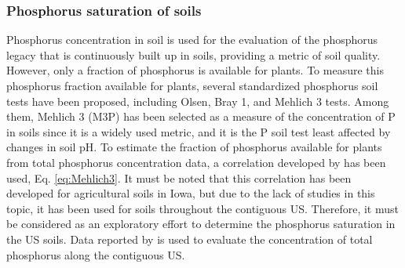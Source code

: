 \documentclass[authoryear]{elsarticle}
\begin{document}
\subsubsection{Phosphorus saturation of soils}
Phosphorus concentration in soil is used for the evaluation of the phosphorus legacy that is continuously built up in soils, providing a metric of soil quality. However, only a fraction of phosphorus is available for plants. To measure this phosphorus fraction available for plants, several standardized phosphorus soil tests have been proposed, including Olsen, Bray 1, and Mehlich 3 tests. Among them,  Mehlich 3 (M3P) has been selected as a measure of the concentration of P in soils since it is a widely used metric, and it is the P soil test least affected by changes in soil pH. To estimate the fraction of phosphorus available for plants from total phosphorus concentration data, a correlation developed by \citet{AllenMallarino2006} has been used, Eq. \ref{eq:Mehlich3}. It must be noted that this correlation has been developed for agricultural soils in Iowa, but due to the lack of studies in this topic, it has been used for soils throughout the contiguous US. Therefore, it must be considered as an exploratory effort to determine the phosphorus saturation in the US soils. Data reported by \citet{SoilsUSGS}
is used to evaluate the concentration of total phosphorus along the contiguous US.
\end{document}
